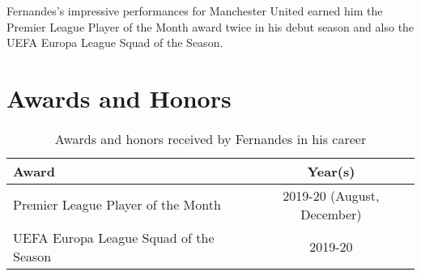 \documentclass{article}
\begin{document}
   Fernandes's impressive performances for Manchester United earned him the Premier League Player of the Month award twice in his debut season and also the UEFA Europa League Squad of the Season.

   \section*{Awards and Honors}
   \begin{table}[h]
      \centering
      \begin{tabular}{|l|c|}
         \hline
         \textbf{Award} & \textbf{Year(s)} \\ \hline
         Premier League Player of the Month & 2019-20 (August, December) \\
         UEFA Europa League Squad of the Season & 2019-20 \\
         \hline
      \end{tabular}
      \caption*{Awards and honors received by Fernandes in his career}
   \label{tab:awards_honors}
   \end{table}

   
\end{document}
